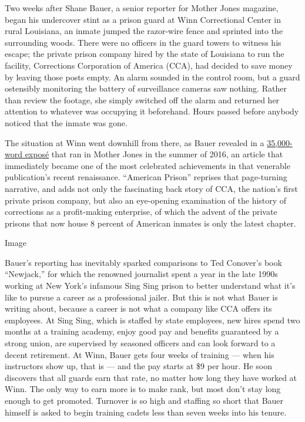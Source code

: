 Two weeks after Shane Bauer, a senior reporter for Mother Jones
magazine, began his undercover stint as a prison guard at Winn
Correctional Center in rural Louisiana, an inmate jumped the razor-wire
fence and sprinted into the surrounding woods. There were no officers in
the guard towers to witness his escape; the private prison company hired
by the state of Louisiana to run the facility, Corrections Corporation
of America (CCA), had decided to save money by leaving those posts
empty. An alarm sounded in the control room, but a guard ostensibly
monitoring the battery of surveillance cameras saw nothing. Rather than
review the footage, she simply switched off the alarm and returned her
attention to whatever was occupying it beforehand. Hours passed before
anybody noticed that the inmate was gone.

The situation at Winn went downhill from there, as Bauer revealed in a
\href{https://www.motherjones.com/politics/2016/06/cca-private-prisons-corrections-corporation-inmates-investigation-bauer/}{35,000-word
exposé} that ran in Mother Jones in the summer of 2016, an article that
immediately became one of the most celebrated achievements in that
venerable publication's recent renaissance. ``American Prison'' reprises
that page-turning narrative, and adds not only the fascinating back
story of CCA, the nation's first private prison company, but also an
eye-opening examination of the history of corrections as a profit-making
enterprise, of which the advent of the private prisons that now house 8
percent of American inmates is only the latest chapter.

Image

Bauer's reporting has inevitably sparked comparisons to Ted Conover's
book ``Newjack,'' for which the renowned journalist spent a year in the
late 1990s working at New York's infamous Sing Sing prison to better
understand what it's like to pursue a career as a professional jailer.
But this is not what Bauer is writing about, because a career is not
what a company like CCA offers its employees. At Sing Sing, which is
staffed by state employees, new hires spend two months at a training
academy, enjoy good pay and benefits guaranteed by a strong union, are
supervised by seasoned officers and can look forward to a decent
retirement. At Winn, Bauer gets four weeks of training --- when his
instructors show up, that is --- and the pay starts at \$9 per hour. He
soon discovers that all guards earn that rate, no matter how long they
have worked at Winn. The only way to earn more is to make rank, but most
don't stay long enough to get promoted. Turnover is so high and staffing
so short that Bauer himself is asked to begin training cadets less than
seven weeks into his tenure.

